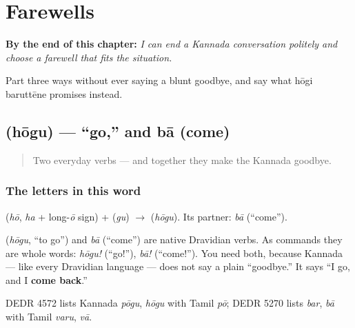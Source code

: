 
\chapter{Farewells}
\label{ch:farewells}

\begin{chapteropening}
\textbf{By the end of this chapter:} \emph{I can end a Kannada conversation politely and choose a farewell that fits the situation.}

Part three ways without ever saying a blunt goodbye, and say what hōgi baruttēne promises instead.
\end{chapteropening}

\section[\texorpdfstring{\kn{ಹೋಗು} (hōgu)}{ಹೋಗು (hōgu)}]{ (hōgu) — \textquotedblleft{}go,\textquotedblright{} and bā (come)}

\label{lesson:KA-C04-hoogu}



\begin{quote}
Two everyday verbs — and together they make the Kannada goodbye.
\end{quote}

\subsection*{The letters in this word}
\textbf{} (\emph{hō}, \emph{ha} + long-\emph{ō} sign) + \textbf{} (\emph{gu}) $\to$ \textbf{} (\emph{hōgu}). Its partner: \emph{bā} (\textquotedblleft{}come\textquotedblright{}).

\begin{cousinweb}
\textbf{} (\emph{hōgu}, \textquotedblleft{}to go\textquotedblright{}) and \emph{bā} (\textquotedblleft{}come\textquotedblright{}) are native Dravidian verbs. As commands they are whole words: \emph{hōgu!} (\textquotedblleft{}go!\textquotedblright{}), \emph{bā!} (\textquotedblleft{}come!\textquotedblright{}). You need both, because Kannada — like every Dravidian language — does not say a plain \textquotedblleft{}goodbye.\textquotedblright{} It says \textquotedblleft{}I go, and I \textbf{come back}.\textquotedblright{}

DEDR 4572 lists Kannada \emph{pōgu}, \emph{hōgu} with Tamil \emph{pō}; DEDR 5270 lists \emph{bar}, \emph{bā} with Tamil \emph{varu}, \emph{vā}.
\end{cousinweb}

